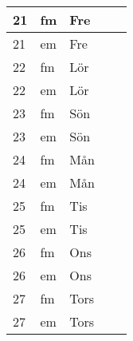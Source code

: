 \documentclass[a4paper]{article}
\begin{document}
\begin{table}[ht!]
\begin{tabular}{lllp{7cm}p{7cm}}
\multicolumn{1}{|l|}{21} & \multicolumn{1}{l|}{fm} & \multicolumn{1}{l|}{Fre} & \multicolumn{1}{l|}{} & \multicolumn{1}{l|}{} \\ \hline
\multicolumn{1}{|l|}{21} & \multicolumn{1}{l|}{em} & \multicolumn{1}{l|}{Fre} & \multicolumn{1}{l|}{} & \multicolumn{1}{l|}{} \\ \hline    

\multicolumn{1}{|l|}{22} & \multicolumn{1}{l|}{fm} & \multicolumn{1}{l|}{Lör} & \multicolumn{1}{l|}{} & \multicolumn{1}{l|}{} \\ \hline
\multicolumn{1}{|l|}{22} & \multicolumn{1}{l|}{em} & \multicolumn{1}{l|}{Lör} & \multicolumn{1}{l|}{} & \multicolumn{1}{l|}{} \\ \hline    

\multicolumn{1}{|l|}{23} & \multicolumn{1}{l|}{fm} & \multicolumn{1}{l|}{Sön} & \multicolumn{1}{l|}{} & \multicolumn{1}{l|}{} \\ \hline
\multicolumn{1}{|l|}{23} & \multicolumn{1}{l|}{em} & \multicolumn{1}{l|}{Sön} & \multicolumn{1}{l|}{} & \multicolumn{1}{l|}{} \\ \hline    

\multicolumn{1}{|l|}{24} & \multicolumn{1}{l|}{fm} & \multicolumn{1}{l|}{Mån} & \multicolumn{1}{l|}{} & \multicolumn{1}{l|}{} \\ \hline
\multicolumn{1}{|l|}{24} & \multicolumn{1}{l|}{em} & \multicolumn{1}{l|}{Mån} & \multicolumn{1}{l|}{} & \multicolumn{1}{l|}{} \\ \hline    

\multicolumn{1}{|l|}{25} & \multicolumn{1}{l|}{fm} & \multicolumn{1}{l|}{Tis} & \multicolumn{1}{l|}{} & \multicolumn{1}{l|}{} \\ \hline
\multicolumn{1}{|l|}{25} & \multicolumn{1}{l|}{em} & \multicolumn{1}{l|}{Tis} & \multicolumn{1}{l|}{} & \multicolumn{1}{l|}{} \\ \hline    

\multicolumn{1}{|l|}{26} & \multicolumn{1}{l|}{fm} & \multicolumn{1}{l|}{Ons} & \multicolumn{1}{l|}{} & \multicolumn{1}{l|}{} \\ \hline
\multicolumn{1}{|l|}{26} & \multicolumn{1}{l|}{em} & \multicolumn{1}{l|}{Ons} & \multicolumn{1}{l|}{} & \multicolumn{1}{l|}{} \\ \hline    

\multicolumn{1}{|l|}{27} & \multicolumn{1}{l|}{fm} & \multicolumn{1}{l|}{Tors} & \multicolumn{1}{l|}{} & \multicolumn{1}{l|}{} \\ \hline
\multicolumn{1}{|l|}{27} & \multicolumn{1}{l|}{em} & \multicolumn{1}{l|}{Tors} & \multicolumn{1}{l|}{} & \multicolumn{1}{l|}{} \\ \hline    


\end{tabular}
\end{table}
\end{document}
